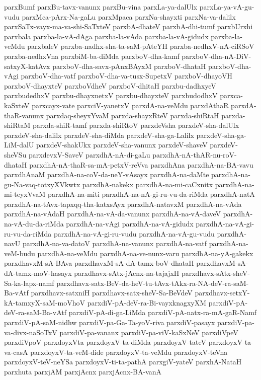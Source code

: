 {parxBumf
parxBu-tavx-vanunx
parxBu-vina
parxLa-ya-dalUlx
parxLa-ya-vA-gu-vudu
parxMca-pArx-Na-gaLu
parxMpaca
parxNa-shayxti
parxNa-va-dalilx
parxSaTx-vayx-ma-va-shi-SaTxteV
parxbA-dhateV
parxbA-dhi-tumf
parxbUrxhi
parxbala
parxba-la-vA-dAga
parxba-la-vAda
parxba-la-vA-gidudx
parxba-la-veMdu
parxbaleV
parxba-nadhx-sha-ta-saM-pAteYH
parxba-nedhxV-nA-ciRSoV
parxba-nedhxVna
parxbiM-ba-diMda
parxboV-dha-kamf
parxboV-dha-nA-DiV-satxyX-katAvx
parxboV-dha-savx-pAnxBAyxM
parxboV-dhataH
parxboV-dha-vAgi
parxboV-dha-vatf
parxboV-dha-va-tusx-SupetxV
parxboV-dhayoVH
parxboV-dhayxteV
parxboVdheV
parxboV-dhitaH
parxbu-dadhxyeV
parxbudedhxV
parxbu-dhayxnetxV
parxbu-dhayxteV
parxbudodhxV
parxca-kaSxteV
parxcayx-vate
parxciV-yanetxV
parxdA-na-veMdu
parxdAthaR
parxdA-thaR-vanunx
parxdaq-sheyxYvaM
parxda-shayxRteV
parxda-shiRtaH
parxda-shiRtaM
parxda-shiR-tamf
parxda-shiRtoV
parxdeVsha
parxdeV-sha-dalUlx
parxdeV-sha-dalilx
parxdeV-sha-diMda
parxdeV-sha-ga-Lalilx
parxdeV-sha-ga-LiM-dalU
parxdeV-shakUkx
parxdeV-sha-vanunx
parxdeV-shaveV
parxdeV-sheVSu
parxdevxV-SaveV
parxdhA-nA-di-gaLu
parxdhA-nA-thAR-nu-roV-dhataH
parxdhA-nA-thaR-sa-mA-petxV-reVva
parxdhAna
parxdhA-na-BA-vavu
parxdhAnaM
parxdhA-na-coV-da-neY-vAsayx
parxdhA-na-daMte
parxdhA-na-gu-Na-vaq-totxyXVkwtx
parxdhA-nakekx
parxdhA-na-mi-caCxnitx
parxdhA-na-mi-teyxVvaM
parxdhA-na-miti
parxdhA-na-nA-gi-ru-vu-da-riMda
parxdhA-natA
parxdhA-na-tAvx-tapxqq-tha-katxsAyx
parxdhA-natavxM
parxdhA-na-vAda
parxdhA-na-vAdaH
parxdhA-na-vA-da-vanunx
parxdhA-na-vA-daveV
parxdhA-na-vA-du-da-riMda
parxdhA-na-vAgi
parxdhA-na-vA-gidudx
parxdhA-na-vA-gi-ru-vu-da-riMda
parxdhA-na-vA-gi-ru-vudu
parxdhA-na-vA-gu-vudu
parxdhA-navU
parxdhA-na-va-datoV
parxdhA-na-vanunx
parxdhA-na-vatf
parxdhA-na-veM-budu
parxdhA-na-veMdu
parxdhA-na-ve-nunx-varu
parxdhA-na-yA-gakekx
parxdhavxM-sA-BAva
parxdhavxM-sA-dA-tamx-boV-dhataH
parxdhavxM-sA-dA-tamx-moV-hasayx
parxdhavx-sAtx-jAcnx-na-tajajxH
parxdhavx-sAtx-sheV-Sa-ka-lapx-namf
parxdhavx-satx-BeV-da-heV-tu-tAvx-tAkx-ra-NA-deV-ra-saM-Ba-vAtf
parxdhavx-satxniH
parxdhavx-satx-sheV-Sa-BeVdeV
parxdhavx-setxY-kA-tamxyX-saM-moVhoV
parxdiV-pA-deV-ra-Bi-vayxknagxyXM
parxdiV-pA-deV-ra-saM-Ba-vAtf
parxdiV-pA-di-ga-LiMda
parxdiV-pA-natx-ra-mA-gaR-Namf
parxdiV-pA-saM-nidhw
parxdiV-pa-Ga-Ta-yoV-riva
parxdiV-pasayx
parxdiV-pa-va-divx-naSoTxV
parxdiV-pa-vananx
parxdiV-pa-viV-kaSxNeV
parxdiVpeV
parxdiVpoV
parxdoyxVta
parxdoyxV-ta-diMda
parxdoyxV-tateV
parxdoyxV-ta-va-casA
parxdoyxV-ta-veM-dide
parxdoyxV-ta-veMdu
parxdoyxV-teVna
parxdoyxV-teV-neYSa
parxdoyxV-ti-ta-pathA
parxgiV-yateV
parxhA-NataH
parxhuta
parxjAM
parxjAcnx
parxjAcnx-BA-vanA
}

